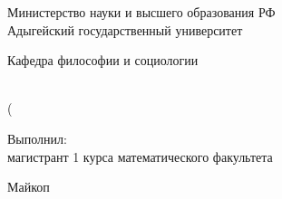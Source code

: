 \makeatletter
\begin{titlepage}
\newpage

\begin{center}
Министерство науки и высшего образования РФ \\
Адыгейский государственный университет
\end{center}

\vspace{8em}

\begin{center}
\Large Кафедра философии и социологии \\ 
\end{center}

\vspace{2em}

\begin{center}
\Large \@title \\
(\subtitle)
\end{center}

\vspace{6em}

\begin{flushright}
Выполнил: \\
магистрант 1 курса математического факультета \\
\@author
\end{flushright}


\vspace{\fill}

\begin{center}
Майкоп \\ \yearf\@date
\end{center}

\end{titlepage}
\makeatother

